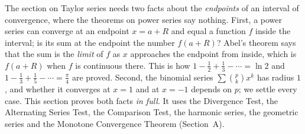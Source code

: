 \documentclass[11pt]{article}
\begin{document}
The section on Taylor series needs two facts about the \emph{endpoints} of an interval of convergence, where the theorems on power series say nothing. First, a power series can converge at an endpoint $x=a+R$ and equal a function $f$ inside the interval; is its sum at the endpoint the number $f(a+R)$? Abel's theorem says that the sum is the \emph{limit} of $f$ as $x$ approaches the endpoint from inside, which is $f(a+R)$ when $f$ is continuous there. This is how $1-\frac12+\frac13-\cdots=\ln2$ and $1-\frac13+\frac15-\cdots=\frac\pi4$ are proved. Second, the binomial series $\sum\binom pkx^k$ has radius $1$, and whether it converges at $x=1$ and at $x=-1$ depends on $p$; we settle every case. This section proves both facts \emph{in full}. It uses the Divergence Test, the Alternating Series Test, the Comparison Test, the harmonic series, the geometric series and the Monotone Convergence Theorem (Section~A).
\end{document}
